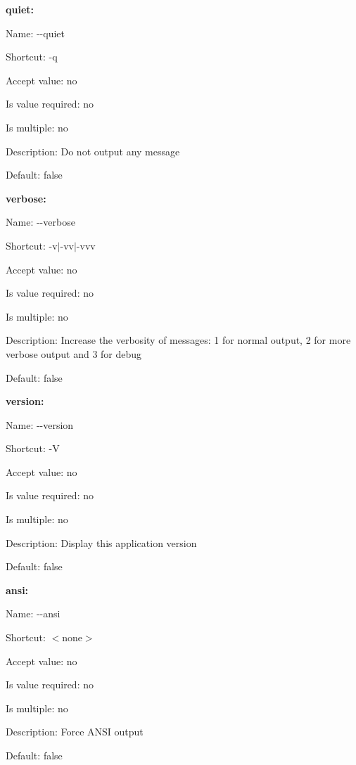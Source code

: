 {\bfseries quiet\+:}


\begin{DoxyItemize}
\item Name\+: {\ttfamily -\/-\/quiet}
\item Shortcut\+: {\ttfamily -\/q}
\item Accept value\+: no
\item Is value required\+: no
\item Is multiple\+: no
\item Description\+: Do not output any message
\item Default\+: {\ttfamily false}
\end{DoxyItemize}

{\bfseries verbose\+:}


\begin{DoxyItemize}
\item Name\+: {\ttfamily -\/-\/verbose}
\item Shortcut\+: {\ttfamily -\/v$\vert$-\/vv$\vert$-\/vvv}
\item Accept value\+: no
\item Is value required\+: no
\item Is multiple\+: no
\item Description\+: Increase the verbosity of messages\+: 1 for normal output, 2 for more verbose output and 3 for debug
\item Default\+: {\ttfamily false}
\end{DoxyItemize}

{\bfseries version\+:}


\begin{DoxyItemize}
\item Name\+: {\ttfamily -\/-\/version}
\item Shortcut\+: {\ttfamily -\/\+V}
\item Accept value\+: no
\item Is value required\+: no
\item Is multiple\+: no
\item Description\+: Display this application version
\item Default\+: {\ttfamily false}
\end{DoxyItemize}

{\bfseries ansi\+:}


\begin{DoxyItemize}
\item Name\+: {\ttfamily -\/-\/ansi}
\item Shortcut\+: $<$none$>$
\item Accept value\+: no
\item Is value required\+: no
\item Is multiple\+: no
\item Description\+: Force A\+N\+S\+I output
\item Default\+: {\ttfamily false}
\end{DoxyItemize}

